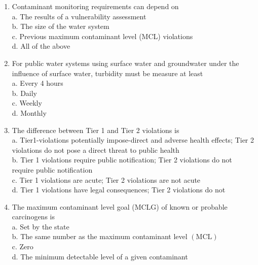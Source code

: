 \documentclass[10pt]{article}
\begin{document}
\begin{enumerate}
\item Contaminant monitoring requirements can depend on\\

a. The results of a vulnerability assessment\\

b. The size of the water system\\

c. Previous maximum contaminant level (MCL) violations\\

d.  All of the above\\

\item For public water systems using surface water and groundwater under the influence of surface water, turbidity must be measure at least\\

a. Every 4 hours\\

b. Daily\\

c. Weekly\\

d. Monthly\\

\item The difference between Tier 1 and Tier 2 violations is\\

a. Tier1-violations potentially impose-direct and adverse health effects; Tier 2 violations do not pose a direct threat to public health\\

b. Tier 1 violations require public notification; Tier 2 violations do not require public notification\\

c. Tier 1 violations are acute; Tier 2 violations are not acute\\

d. Tier 1 violations have legal consequences; Tier 2 violations do not\\


\item The maximum contaminant level goal (MCLG) of known or probable carcinogens is\\
a. Set by the state\\
b. The same number as the maximum contaminant level $(\mathrm{MCL})$\\
c. Zero\\
d. The minimum detectable level of a given contaminant\\


\end{enumerate}
\end{document}
